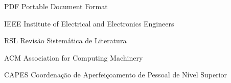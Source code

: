 \begin{siglas}
  \item[PDF] Portable Document Format
  \item[IEEE] Institute of Electrical and Electronics Engineers
  \item[RSL] Revisão Sistemática de Literatura
  \item[ACM] Association for Computing Machinery
  \item[CAPES] Coordenação de Aperfeiçoamento de Pessoal de Nível Superior
\end{siglas}
